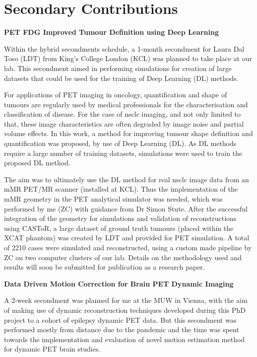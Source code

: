 \chapter*{Secondary Contributions}
\label{Secondary_Contributions}

\textbf{PET FDG Improved Tumour Definition using Deep Learning}

Within the \gls{hybrid} secondments schedule, a 1-month secondment for Laura Dal Toso (LDT) from King's College London (KCL) was planned to take place at our lab. This secondment aimed in performing simulations for creation of large datasets that could be used for the training of Deep Learning (DL) methods.

For applications of PET imaging in oncology, quantification and shape of tumours are regularly used by medical professionals for the characterisation and classification of disease. For the case of \gls{nsclc} imaging, and not only limited to that, these image characteristics are often degraded by image noise and partial volume effects.
In this work, a method for improving tumour shape definition and quantification was proposed, by use of Deep Learning (DL). As DL methods require a large number of training datasets, simulations were used to train the proposed DL method. 

The aim was to ultimately use the DL method for real \gls{nsclc} image data from an mMR PET/MR scanner (installed at KCL). Thus the implementation of the mMR geometry in the PET analytical simulator was needed, which was performed by me (ZC) with guidance from Dr Simon Stute. After the successful integration of the geometry for simulations and validation of reconstructions using CASToR, a large dataset of ground truth tumours (placed within the XCAT phantom) was created by LDT and provided for PET simulation. A total of 2210 cases were simulated and reconstructed, using a custom made pipeline by ZC on two computer clusters of our lab.
Details on the methodology used and results will soon be submitted for publication as a research paper.

\textbf{Data Driven Motion Correction for Brain PET Dynamic Imaging}

A 2-week secondment was planned for me at the MUW in Vienna, with the aim of making use of dynamic reconstruction techniques developed during this PhD project to a cohort of epilepsy dynamic PET data. But this secondment was performed mostly from distance due to the pandemic and the time was spent towards the implementation and evaluation of novel motion estimation method for dynamic PET brain studies. 

